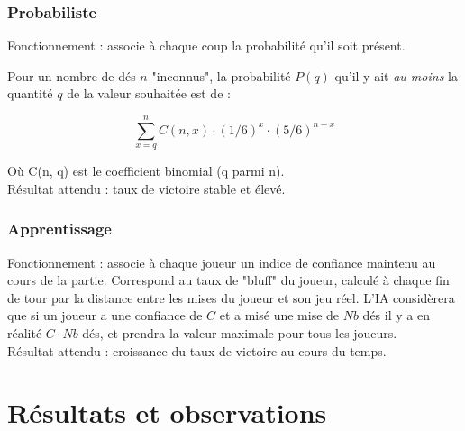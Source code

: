 \documentclass{beamer}
\begin{document}
\begin{frame}
  \frametitle{Probabiliste}

  Fonctionnement : associe à chaque coup la probabilité qu'il soit présent.

  Pour un nombre de dés $n$ "inconnus", la probabilité $P(q)$ qu'il y ait
  \emph{au moins} la quantité $q$ de la valeur souhaitée est de :

  $$
  \sum\limits_{x=q}^n C(n, x) \cdot (1/6)^x \cdot (5/6)^{n-x}
  $$

  Où C(n, q) est le coefficient binomial (q parmi n).
  \\[1cm]

  Résultat attendu : taux de victoire stable et élevé.
\end{frame}

\begin{frame}
  \frametitle{Apprentissage}

  Fonctionnement : associe à chaque joueur un indice de confiance maintenu au
  cours de la partie. Correspond au taux de "bluff" du joueur, calculé à chaque
  fin de tour par la distance entre les mises du joueur et son jeu réel. L'IA
  considèrera que si un joueur a une confiance de $C$ et a misé une mise de
  $Nb$ dés il y a en réalité $C \cdot Nb$ dés, et prendra la valeur maximale
  pour tous les joueurs.
  \\[1cm]
  Résultat attendu : croissance du taux de victoire au cours du temps.
\end{frame}

\section{Résultats et observations}
\end{document}
